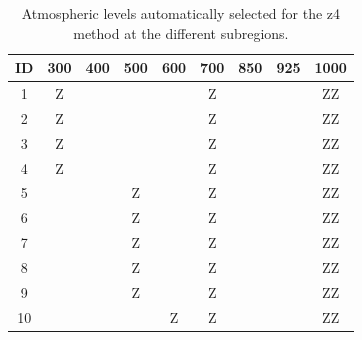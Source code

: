 \documentclass[twocol]{ametsoc}
\begin{document}
\begin{table}[htbp]
	\footnotesize
	\caption{Atmospheric levels automatically selected for the z4 method at the different subregions.}
	\begin{center}
		\begin{tabular}{ccccccccc}
			\hline \textbf{ID} & \textbf{300} & \textbf{400} & \textbf{500} & \textbf{600} & \textbf{700} & \textbf{850} & \textbf{925} & \textbf{1000} \\ 
			\hline 
			1  & Z &   &   &   & Z &   &   & ZZ \\
			2  & Z &   &   &   & Z &   &   & ZZ \\
			3  & Z &   &   &   & Z &   &   & ZZ \\
			4  & Z &   &   &   & Z &   &   & ZZ \\
			5  &   &   & Z &   & Z &   &   & ZZ \\
			6  &   &   & Z &   & Z &   &   & ZZ \\
			7  &   &   & Z &   & Z &   &   & ZZ \\
			8  &   &   & Z &   & Z &   &   & ZZ \\
			9  &   &   & Z &   & Z &   &   & ZZ \\
			10 &   &   &   & Z & Z &   &   & ZZ \\
			\hline 
		\end{tabular} 
	\end{center}
	\label{table:levels_GA_z4}
\end{table}
\end{document}
